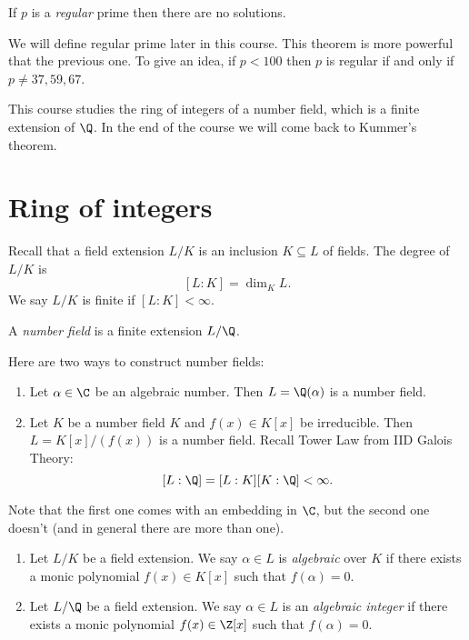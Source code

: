 \documentclass[a4paper]{article}
\begin{document}
\begin{theorem}[Kummer, 1850]
  If \(p\) is a \emph{regular} prime then there are no solutions.
\end{theorem}

We will define regular prime later in this course. This theorem is more powerful that the previous one. To give an idea, if \(p < 100\) then \(p\) is regular if and only if \(p \neq 37, 59, 67\).

This course studies the ring of integers of a number field, which is a finite extension of \(\Q\). In the end of the course we will come back to Kummer's theorem.

\section{Ring of integers}

Recall that a field extension \(L/K\) is an inclusion \(K \subseteq L\) of fields. The degree of \(L/K\) is
\[
  [L:K] = \dim_K L.
\]
We say \(L/K\) is finite if \([L:K] < \infty\).

\begin{definition}
  A \emph{number field} is a finite extension \(L/\Q\).
\end{definition}

Here are two ways to construct number fields:
\begin{enumerate}
\item Let \(\alpha \in \C\) be an algebraic number. Then \(L = \Q(\alpha)\) is a number field.
\item Let \(K\) be a number field \(K\) and \(f(x) \in K[x]\) be irreducible. Then \(L = K[x]/(f(x))\) is a number field. Recall Tower Law from IID Galois Theory:
  \[
    [L:\Q] = [L:K][K:\Q] < \infty.
  \]
\end{enumerate}
Note that the first one comes with an embedding in \(\C\), but the second one doesn't (and in general there are more than one).

\begin{definition}\leavevmode
  \begin{enumerate}
  \item Let \(L/K\) be a field extension. We say \(\alpha \in L\) is \emph{algebraic} over \(K\) if there exists a monic polynomial \(f(x) \in K[x]\) such that \(f(\alpha) = 0\).
  \item Let \(L/\Q\) be a field extension. We say \(\alpha \in L\) is an \emph{algebraic integer} if there exists a monic polynomial \(f(x) \in \Z[x]\) such that \(f(\alpha) = 0\).
  \end{enumerate}
\end{definition}
\end{document}
